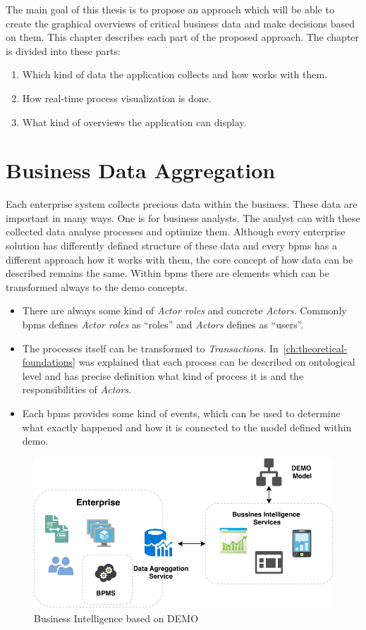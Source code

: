 The main goal of this thesis is to propose an approach which will be able to create the graphical overviews of critical business data and make decisions based on them. This chapter describes each part of the proposed approach. The chapter is divided into these parts:    
    \begin{enumerate}
      \item Which kind of data the application collects and how works with them.
      \item How real-time process visualization is done.
      \item What kind of overviews the application can display. 
    \end{enumerate}
\section{Business Data Aggregation}
Each enterprise system collects precious data within the business. These data are important in many ways. One is for business analysts. The analyst can with these collected data analyse processes and optimize them. Although every enterprise solution has differently defined structure of these data and every \gls{bpms} has a different approach how it works with them, the core concept of how data can be described remains the same. 
Within \gls{bpms} there are elements which can be transformed always to the \gls{demo} concepts.
\begin{itemize}
\item There are always some kind of \textit{Actor roles} and concrete \textit{Actors}. Commonly \gls{bpms} defines \textit{Actor roles} as ``roles'' and \textit{Actors} defines as ``users''.
\item The processes itself can be transformed to \textit{Transactions}. In~\cref{ch:theoretical-foundations} was explained that each process can be described on ontological level and has precise definition what kind of process it is and the responsibilities of \textit{Actors}.
\item Each \gls{bpms} provides some kind of events, which can be used to determine what exactly happened and how it is connected to the model defined within \gls{demo}.
\end{itemize}

\begin{figure}[ht!]
  \centering
  \includegraphics[width=12cm,keepaspectratio]{img/bi-demo-overview}
  \caption{Business Intelligence based on DEMO}
  \label{fig:bi-demo-overview}
\end{figure}    


